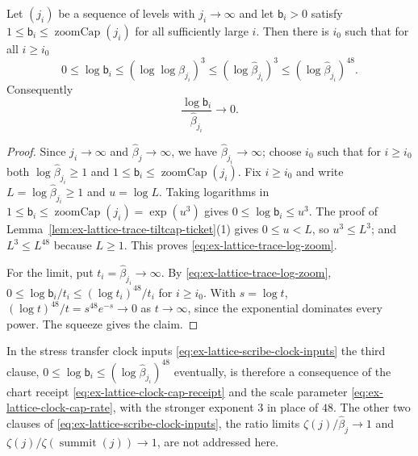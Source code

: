 \begin{lemma}
\label{lem:ex-lattice-trace-log-zoom}
Let $(j_i)$ be a sequence of levels with $j_i\to\infty$ and let
$\mathsf b_i>0$ satisfy $1\leq\mathsf b_i\leq\operatorname{zoomCap}(j_i)$
for all sufficiently large $i$. Then there is $i_0$ such that for all
$i\geq i_0$
\begin{equation}
 0\leq\log\mathsf b_i
 \leq(\log\log\widehat\beta_{j_i})^3
 \leq(\log\widehat\beta_{j_i})^3
 \leq(\log\widehat\beta_{j_i})^{48}.
 \label{eq:ex-lattice-trace-log-zoom}
\end{equation}
Consequently
\[
 \frac{\log\mathsf b_i}{\widehat\beta_{j_i}}\longrightarrow0 .
\]
\end{lemma}

\begin{proof}
Since $j_i\to\infty$ and $\widehat\beta_j\to\infty$, we have
$\widehat\beta_{j_i}\to\infty$; choose $i_0$ such that for $i\geq i_0$
both $\log\widehat\beta_{j_i}\geq1$ and
$1\leq\mathsf b_i\leq\operatorname{zoomCap}(j_i)$. Fix $i\geq i_0$ and
write $L=\log\widehat\beta_{j_i}\geq1$ and $u=\log L$. Taking logarithms
in $1\leq\mathsf b_i\leq\operatorname{zoomCap}(j_i)=\exp(u^3)$ gives
$0\leq\log\mathsf b_i\leq u^3$. The proof of
Lemma~\ref{lem:ex-lattice-trace-tiltcap-ticket}(1) gives $0\leq u<L$, so
$u^3\leq L^3$; and $L^3\leq L^{48}$ because $L\geq1$. This proves
\eqref{eq:ex-lattice-trace-log-zoom}.

For the limit, put $t_i=\widehat\beta_{j_i}\to\infty$. By
\eqref{eq:ex-lattice-trace-log-zoom},
$0\leq\log\mathsf b_i/t_i\leq(\log t_i)^{48}/t_i$ for $i\geq i_0$. With
$s=\log t$, $(\log t)^{48}/t=s^{48}e^{-s}\to0$ as $t\to\infty$, since the
exponential dominates every power. The squeeze gives the claim.
\end{proof}

In the stress transfer clock inputs \eqref{eq:ex-lattice-scribe-clock-inputs} the
third clause, $0\leq\log\mathsf b_i\leq(\log\widehat\beta_{j_i})^{48}$
eventually, is therefore a consequence of the chart receipt
\eqref{eq:ex-lattice-clock-cap-receipt} and the scale parameter
\eqref{eq:ex-lattice-clock-cap-rate}, with the stronger exponent $3$ in
place of $48$. The other two clauses of
\eqref{eq:ex-lattice-scribe-clock-inputs}, the ratio limits
$\zeta(j)/\widehat\beta_j\to1$ and
$\zeta(j)/\zeta(\operatorname{summit}(j))\to1$, are not addressed here.
